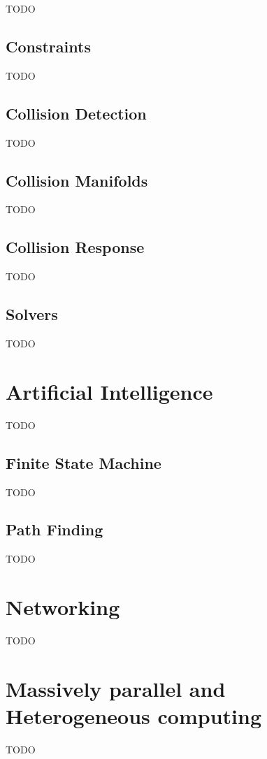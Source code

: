\documentclass[a4paper]{article}
\begin{document}
TODO

\subsection{Constraints}

TODO

\subsection{Collision Detection}

TODO

\subsection{Collision Manifolds}

TODO

\subsection{Collision Response}

TODO

\subsection{Solvers}

TODO

\section{Artificial Intelligence}

TODO

\subsection{Finite State Machine}

TODO

\subsection{Path Finding}

TODO

\section{Networking}

TODO

\section{Massively parallel and Heterogeneous computing}

TODO
\end{document}
